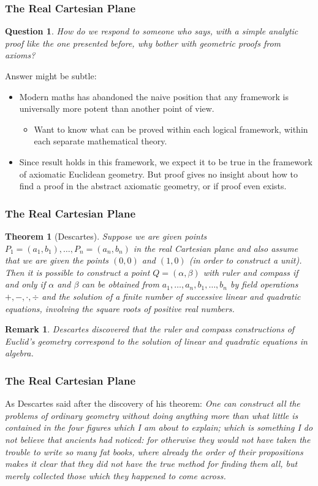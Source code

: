 \documentclass[compress,mathserif,serif]{beamer}
\newtheorem{thm}{Theorem}
\newtheorem{question}{Question}
\newtheorem{rem}{Remark}
\begin{document}
\begin{frame}
\frametitle{The Real Cartesian Plane}
\begin{question}How do we
respond to someone who says, with a simple analytic proof like the one presented before, why bother with geometric proofs from axioms?
\end{question}
\pause
Answer might be subtle:
\pause
\begin{itemize}
\item Modern maths has abandoned the naive position
that any framework is universally more potent than another
point of view. 
\pause
\begin{itemize}
\item Want to know what can be proved within each logical framework, within each separate mathematical theory. 
\end{itemize}
\pause
\item Since result holds in this framework, we expect it
to be true in the framework of axiomatic Euclidean geometry. But proof gives no insight about how to find a proof in the abstract axiomatic
geometry, or if proof even exists.
\end{itemize}
\end{frame}



\begin{frame}
\frametitle{The Real Cartesian Plane}
\begin{thm}[Descartes] Suppose we are given points $P_1=(a_1,b_1), \dots ,  P_n=(a_n,b_n)$ in the real Cartesian plane and also assume that we are given the points $(0,0)$ and $(1,0)$ (in order to construct a unit). Then it is possible to construct a point $Q= ( \alpha,  \beta)$ with ruler and compass if and only if $\alpha$ and $\beta$ can be obtained from $a_1, \dots , a_n, b_1, \dots , b_n$ by field operations $+,-, \cdot, \div$ and the solution of a finite number of successive linear and quadratic equations, involving the square roots of positive real numbers. 
\end{thm}
\pause
\begin{rem} Descartes discovered that the ruler and compass constructions of Euclid's geometry correspond to the solution of linear and quadratic equations in algebra.
\end{rem}
\end{frame}


\begin{frame}
\frametitle{The Real Cartesian Plane}
As Descartes said after the discovery of his theorem:
\newline
\newline
\textit{One can construct all the problems of ordinary geometry without doing anything more than what little is contained in the four figures which I am about to explain; which is something I do not believe that ancients had noticed: for otherwise they would not have taken the trouble to write so many fat books,  where already the order of their propositions makes it clear that they did not have the true method for finding them all,  but merely collected those which they happened to come across.}
\end{frame}
\end{document}
